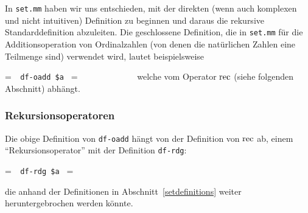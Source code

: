 In \texttt{set.mm} haben wir uns entschieden, mit der direkten (wenn auch komplexen und nicht intuitiven) Definition zu beginnen und daraus die rekursive Standarddefinition abzuleiten. Die geschlossene Definition, die in \texttt{set.mm} für die Additionsoperation von Ordinalzahlen (von denen die natürlichen Zahlen eine Teilmenge sind) verwendet wird, lautet beispielsweise 

\setbox\startprefix=\hbox{\tt \ \ df-oadd\ \$a\ }
\setbox\contprefix=\hbox{\tt \ \ \ \ \ \ \ \ \ \ \ \ \ }
\startm
\m{\vdash}\m{=}\m{(}\m{\in}\m{,}\m{\in}\m{\mapsto}\m{(}\m{(}\m{(}\m{\in}\m{\mapsto}\m{)}\m{,}\m{)}\m{)}\m{)}
\endm
\noindent welche vom Operator ${\rm rec}$ (siehe folgenden Abschnitt) abhängt.

\subsubsection{Rekursionsoperatoren}

Die obige Definition von \texttt{df-oadd} hängt von der Definition von ${\rm rec}$ ab, einem "`Rekursionsoperator"' mit der Definition \texttt{df-rdg}: 

\setbox\startprefix=\hbox{\tt \ \ df-rdg\ \$a\ }
\setbox\contprefix=\hbox{\tt \ \ \ \ \ \ \ \ \ \ \ \ }
\startm
\m{\vdash}\m{(}\m{,}\m{)}\m{=}\m{(}\m{(}\m{\in}\m{\mapsto}\m{(}\m{=}\m{\varnothing}\m{,}\m{,}\m{(}\m{,}\m{\bigcup}\m{,}\m{(}\m{(}\m{\bigcup}\m{)}\m{)}\m{)}\m{)}\m{)}\m{)}
\endm

\noindent die anhand der Definitionen in Abschnitt~\ref{setdefinitions} weiter heruntergebrochen werden könnte.

